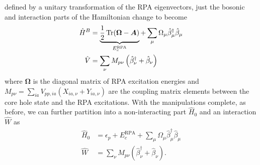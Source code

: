 defined by a unitary transformation of the RPA eigenvectors, just the bosonic and interaction parts of the Hamiltonian change to become
\begin{align}
    \hat{H}^B &= \underbrace{\frac{1}{2} \Tr(\bm{\Omega} - \bm{A})}_{E_c^{\text{RPA}}} + \sum_\mu \Omega_\mu \hat{\beta}_\mu^\dagger \hat{\beta}_\mu \\
    \hat{V} &= \sum_{\nu} M_{p\nu} \left( \hat{\beta}_\nu^\dagger + \hat{\beta}_\nu \right)
\end{align}
where $\bm{\Omega}$ is the diagonal matrix of RPA excitation energies and $M_{p\nu} = \sum_{ia} V_{pp,ia} (X_{ia,\nu} + Y_{ia,\nu})$ are the coupling matrix elements between the core hole state and the RPA excitations.
With the manipulations complete, as before, we can further partition into a non-interacting part $\hat{H}_0$ and an interaction $\hat{W}$ as
\begin{align}
    \hat{H}_0 &= \epsilon_{p} + E_c^{\text{RPA}} + \sum_\mu \Omega_\mu \hat{\beta}_\mu^\dagger \hat{\beta}_\mu \\
    \hat{W} &= \sum_{\nu} M_{p\nu} \left( \hat{\beta}_\nu^\dagger + \hat{\beta}_\nu \right).
\end{align}
